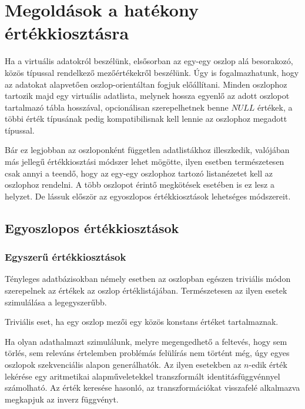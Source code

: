 \documentclass[
    parspace, %
    noindent, %
]{elteiktdk}[2023/10/30]
\begin{document}

\section{Megoldások a hatékony értékkiosztásra}

Ha a virtuális adatokról beszélünk, elsősorban az egy-egy oszlop alá besorakozó,
közös típussal rendelkező mezőértékekről beszélünk.
Úgy is fogalmazhatunk, hogy az adatokat alapvetően oszlop-orientáltan fogjuk előállítani.
Minden oszlophoz tartozik majd egy virtuális adatlista,
melynek hossza egyenlő az adott oszlopot tartalmazó tábla hosszával,
opcionálisan szerepelhetnek benne $NULL$ értékek,
a többi érték típusának pedig kompatibilisnak kell lennie az oszlophoz megadott típussal.

Bár ez legjobban az oszloponként független adatlistákhoz illeszkedik,
valójában más jellegű értékkiosztási módszer lehet mögötte,
ilyen esetben természetesen csak annyi a teendő,
hogy az egy-egy oszlophoz tartozó listanézetet kell az oszlophoz rendelni.
A több oszlopot érintő megkötések esetében is ez lesz a helyzet.
De lássuk először az egyoszlopos értékkiosztások lehetséges módszereit.

\subsection{Egyoszlopos értékkiosztások}


\subsubsection{Egyszerű értékkiosztások}

Tényleges adatbázisokban némely esetben az oszlopban egészen triviális módon szerepelnek az értékek az oszlop értéklistájában.
Természetesen az ilyen esetek szimulálása a legegyszerűbb.

Triviális eset, ha egy oszlop mezői egy közös konstans értéket tartalmaznak.

Ha olyan adathalmazt szimulálunk, melyre megengedhető a feltevés,
hogy sem törlés, sem releváns értelemben problémás felülírás nem történt még,
úgy egyes oszlopok szekvenciális alapon generálhatók.
Az ilyen esetekben az $n$-edik érték lekérése
egy aritmetikai alapműveletekkel transzformált identitásfüggvénnyel számolható.
Az érték keresése hasonló, az transzformációkat visszafelé alkalmazva megkapjuk az inverz függvényt.
\end{document}
